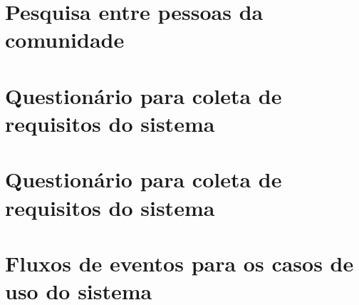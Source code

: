 \chapter{Pesquisa entre pessoas da comunidade}
\label{ch:pesquisa}
% 



\chapter{Questionário para coleta de requisitos do sistema}
\label{ch:coleta-requisitos}




\chapter{Questionário para coleta de requisitos do sistema}
\label{ch:coleta-requisitos-respostas}




\chapter{Fluxos de eventos para os casos de uso do sistema}
\label{ch:fluxos-eventos}


